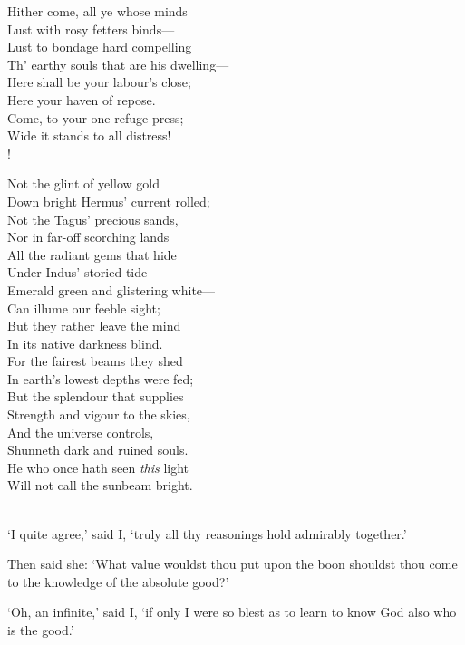 \documentclass[12pt]{book}
\newenvironment{ipoem}[1]%
  {\setcounter{poemindentevery}{#1}\begin{poem}\small}%
  {\end{poem}\setcounter{poemindentevery}{0}}
\begin{document}
\begin{ipoem}{0}
    Hither come, all ye whose minds \\
    Lust with rosy fetters binds--- \\
    Lust to bondage hard compelling \\
    Th' earthy souls that are his dwelling--- \\
    Here shall be your labour's close; \\
    Here your haven of repose. \\
    Come, to your one refuge press; \\
    Wide it stands to all distress! \\!

    Not the glint of yellow gold \\
    Down bright Hermus' current rolled; \\
    Not the Tagus' precious sands, \\
    Nor in far-off scorching lands \\
    All the radiant gems that hide \\
    Under Indus' storied tide--- \\
    Emerald green and glistering white--- \\
    Can illume our feeble sight; \\
    But they rather leave the mind \\
    In its native darkness blind. \\
    For the fairest beams they shed \\
    In earth's lowest depths were fed; \\
    But the splendour that supplies \\
    Strength and vigour to the skies, \\
    And the universe controls, \\
    Shunneth dark and ruined souls. \\
    He who once hath seen \emph{this} light \\
    Will not call the sunbeam bright. \\-
\end{ipoem}

`I quite agree,' said I, `truly all thy reasonings hold admirably
together.'

Then said she: `What value wouldst thou put upon the boon shouldst thou
come to the knowledge of the absolute good?'

`Oh, an infinite,' said I, `if only I were so blest as to learn to know
God also who is the good.'
\end{document}
